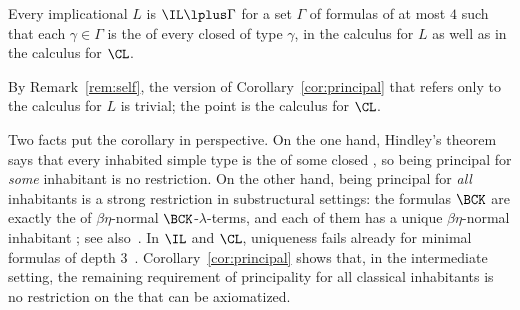 \begin{corollary}\label{cor:principal}
Every implicational  $L$ is $\IL\lplus\Gamma$ for a set
$\Gamma$ of formulas of  at most $4$ such that each
$\gamma\in\Gamma$ is the  of every closed  of
type $\gamma$, in the calculus for $L$ as well as in the calculus for $\CL$.
\end{corollary}

By Remark~\ref{rem:self}, the version of Corollary~\ref{cor:principal} that
refers only to the calculus for $L$ is trivial; the point is the calculus
for $\CL$.

Two facts put the corollary in perspective. On the one hand, Hindley's
theorem~\cite{Hin69} says that every inhabited simple type is the
 of some closed , so being principal for
\emph{some} inhabitant is no restriction. On the other hand, being principal
for \emph{all} inhabitants is a strong restriction in substructural
settings: the formulas  $\BCK$ are exactly the
 of $\beta\eta$-normal $\BCK$-$\lambda$-terms, and each
of them has a unique $\beta\eta$-normal inhabitant
\cite{Hir92,Hir93,Tat06}; see also~\cite{Hir91,KH93}. In $\IL$ and $\CL$,
uniqueness fails already for minimal formulas of depth $3$~\cite{Tat93}.
Corollary~\ref{cor:principal} shows that, in the intermediate setting, the
remaining requirement of principality for all classical inhabitants is no
restriction on the  that can be axiomatized.
